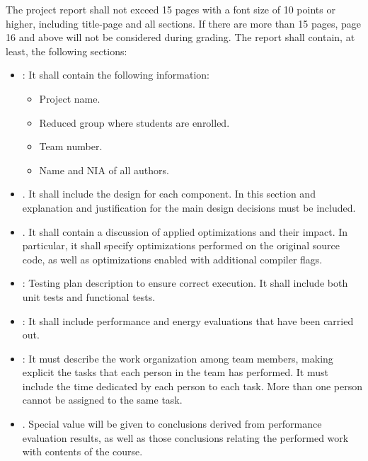 The project report shall not exceed 15 pages with a font size of 10 points
or higher, including title-page and all sections. If there are more than
15 pages, page 16 and above will not be considered during grading.
The report shall contain, at least, the following sections:

\begin{itemize}

\item {}: It shall contain the following information:
  \begin{itemize}
    \item Project name.
    \item Reduced group where students are enrolled.
    \item Team number.
    \item Name and NIA of all authors.
  \end{itemize}

\item {}. 
      It shall include the design for each component.
      In this section and explanation and justification for the main
      design decisions must be included.

\item {}. 
      It shall contain a discussion of applied optimizations and their
      impact. In particular, it shall specify optimizations performed
      on the original source code, as well as optimizations enabled
      with additional compiler flags.

\item {}: 
      Testing plan description to ensure correct execution.
      It shall include both unit tests and functional tests.

\item {}:
      It shall include performance and energy evaluations that have been
      carried out.

\item {}:
      It must describe the work organization among team members, 
      making explicit the tasks that each person in the team has performed.
      It must include the time dedicated by each person to each task.
      More than one person cannot be assigned to the same task.

\item {}.
      Special value will be given to conclusions derived from performance evaluation
      results, as well as those conclusions relating the performed work with
      contents of the course.

\end{itemize}

